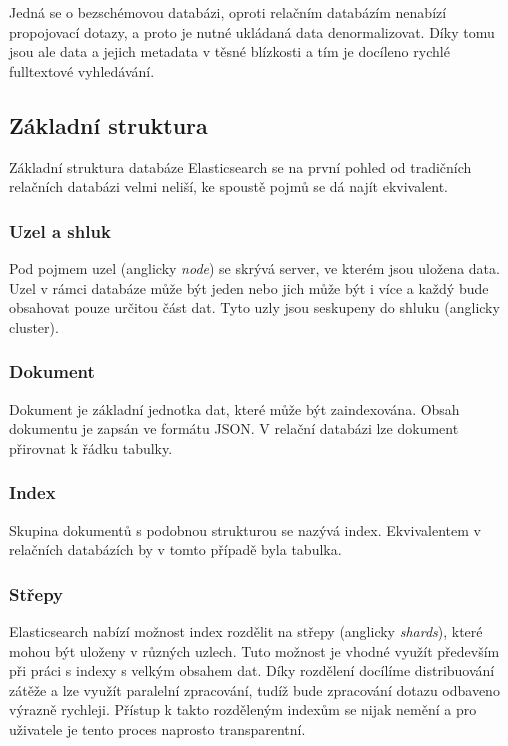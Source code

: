 Jedná se o bezschémovou databázi, oproti relačním databázím nenabízí propojovací dotazy, a proto je nutné ukládaná data denormalizovat. Díky tomu jsou ale data a jejich metadata v těsné blízkosti a tím je docíleno rychlé fulltextové vyhledávání. %

\subsection{Základní struktura}
Základní struktura databáze Elasticsearch se na první pohled od tradičních relačních databázi velmi neliší, ke spoustě pojmů se dá najít ekvivalent.

\subsubsection*{Uzel a shluk}
Pod pojmem uzel (anglicky \emph{node}) se skrývá server, ve kterém jsou uložena data. Uzel v rámci databáze může být jeden nebo jich může být i více a každý bude obsahovat pouze určitou část dat. Tyto uzly jsou seskupeny do shluku (anglicky cluster).

\subsubsection*{Dokument}\label{section:dokument}
Dokument je základní jednotka dat, které může být zaindexována. Obsah dokumentu je zapsán ve formátu JSON. V relační databázi lze dokument přirovnat k řádku tabulky.

\subsubsection*{Index}\label{section:index}
Skupina dokumentů s podobnou strukturou se nazývá index. Ekvivalentem v relačních databázích by v tomto případě byla tabulka.

\subsubsection*{Střepy}
Elasticsearch nabízí možnost index rozdělit na střepy (anglicky \emph{shards}), které mohou být uloženy v různých uzlech. Tuto možnost je vhodné využít především při práci s indexy s velkým obsahem dat. Díky rozdělení docílíme distribuování zátěže a lze využít paralelní zpracování, tudíž bude zpracování dotazu odbaveno výrazně rychleji. 
Přístup k takto rozděleným indexům se nijak nemění a pro uživatele je tento proces naprosto transparentní.


